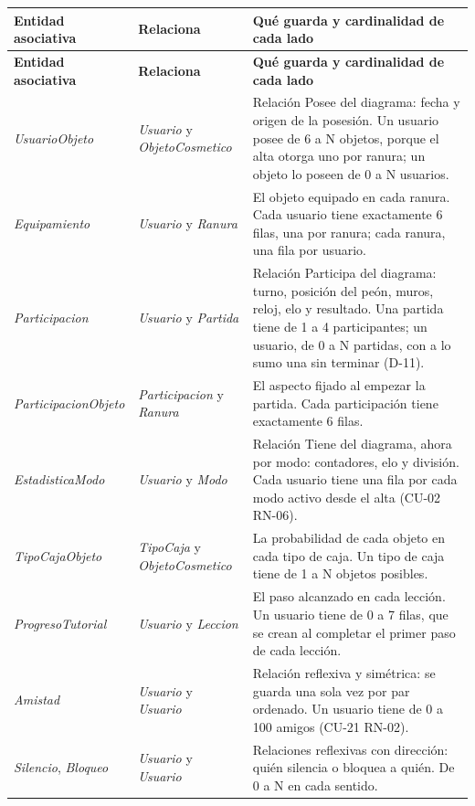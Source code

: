 \begin{center}\small
\begin{longtable}{|L{0.19\textwidth}|L{0.25\textwidth}|L{0.46\textwidth}|}
\hline
\textbf{Entidad asociativa} & \textbf{Relaciona} & \textbf{Qué guarda y cardinalidad de cada lado} \\ \hline
\endfirsthead
\hline
\textbf{Entidad asociativa} & \textbf{Relaciona} & \textbf{Qué guarda y cardinalidad de cada lado} \\ \hline
\endhead
\textit{UsuarioObjeto} & \textit{Usuario} y \textit{ObjetoCosmetico} & Relación Posee del diagrama: fecha y origen de la posesión. Un usuario posee de 6 a N objetos, porque el alta otorga uno por ranura; un objeto lo poseen de 0 a N usuarios. \\ \hline
\textit{Equipamiento} & \textit{Usuario} y \textit{Ranura} & El objeto equipado en cada ranura. Cada usuario tiene exactamente 6 filas, una por ranura; cada ranura, una fila por usuario. \\ \hline
\textit{Participacion} & \textit{Usuario} y \textit{Partida} & Relación Participa del diagrama: turno, posición del peón, muros, reloj, elo y resultado. Una partida tiene de 1 a 4 participantes; un usuario, de 0 a N partidas, con a lo sumo una sin terminar (\mbox{D-11}). \\ \hline
\textit{ParticipacionObjeto} & \textit{Participacion} y \textit{Ranura} & El aspecto fijado al empezar la partida. Cada participación tiene exactamente 6 filas. \\ \hline
\textit{EstadisticaModo} & \textit{Usuario} y \textit{Modo} & Relación Tiene del diagrama, ahora por modo: contadores, elo y división. Cada usuario tiene una fila por cada modo activo desde el alta (\mbox{CU-02} \mbox{RN-06}). \\ \hline
\textit{TipoCajaObjeto} & \textit{TipoCaja} y \textit{ObjetoCosmetico} & La probabilidad de cada objeto en cada tipo de caja. Un tipo de caja tiene de 1 a N objetos posibles. \\ \hline
\textit{ProgresoTutorial} & \textit{Usuario} y \textit{Leccion} & El paso alcanzado en cada lección. Un usuario tiene de 0 a 7 filas, que se crean al completar el primer paso de cada lección. \\ \hline
\textit{Amistad} & \textit{Usuario} y \textit{Usuario} & Relación reflexiva y simétrica: se guarda una sola vez por par ordenado. Un usuario tiene de 0 a 100 amigos (\mbox{CU-21} \mbox{RN-02}). \\ \hline
\textit{Silencio}, \textit{Bloqueo} & \textit{Usuario} y \textit{Usuario} & Relaciones reflexivas con dirección: quién silencia o bloquea a quién. De 0 a N en cada sentido. \\ \hline
\end{longtable}
\end{center}

